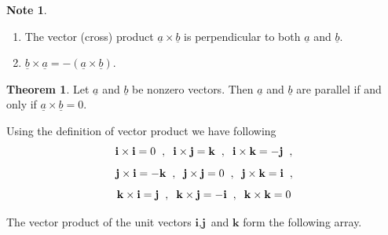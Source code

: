 \documentclass[11pt,a4paper]{article}
\theoremstyle{definition}
\newtheorem{thm}{Theorem}[subsection]
\newtheorem*{note}{Note}
\begin{document}
\begin{note}
\begin{enumerate}
\item The vector (cross) product $\underline{a} \times \underline{b}$ is perpendicular to both $\underline{a}$ and $\underline{b}$.
\item $\underline{b}\times \underline{a} = -(\underline{a} \times \underline{b})$.
\end{enumerate}
\end{note}

\begin{thm}


Let $\underline{a}$ and  $\underline{b}$ be nonzero vectors. Then $\underline{a}$ and  $\underline{b}$ are parallel if and only if $\underline{a} \times \underline{b} =0$.


Using the definition of vector product we have following 
$$ \textbf{i}\times \textbf{i}= 0 \hspace{0.2cm}, \hspace{0.2cm} \textbf{i}\times \textbf{j} = \textbf{k} \hspace{0.2cm} ,\hspace{0.2cm} \textbf{i} \times \textbf{k} = - \textbf{j}\hspace{0.2cm} ,$$
$$\textbf{j} \times \textbf{i} = -\textbf{k}\hspace{0.2cm} , \hspace{0.2cm} \textbf{j} \times \textbf{j} = 0 \hspace{0.2cm} , \hspace{0.2cm}  \textbf{j} \times \textbf{k} = \textbf{i}\hspace{0.2cm}, $$
$$\textbf{k} \times \textbf{i} = \textbf{j}\hspace{0.2cm}, \hspace{0.2cm} \textbf{k} \times \textbf{j} = -\textbf{i} \hspace{0.2cm} , \hspace{0.2cm} \textbf{k} \times \textbf{k} = 0$$

The vector product of the unit vectors $\textbf{i}, \textbf{j}$ and $\textbf{k}$ form the following array.


\begin{figure}[H]
\centering
{}
\end{figure}


\end{thm}
\end{document}
